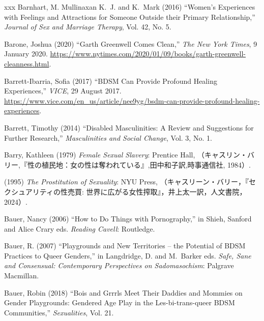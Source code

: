 \documentclass[]{jlreq} \usepackage{mystyle}
\begin{document}
\begin{thebibliography}{xxx}
Barnhart, M. Mullinaxan K.~J. and K.~Mark (2016) ``Women's Experiences with
  Feelings and Attractions for Someone Outside their Primary Relationship,''
  \textit{ Journal of Sex and Marriage Therapy}, Vol. 42, No. 5.

Barone, Joshua (2020) ``Garth Greenwell Comes Clean,'' \emph{The New York
  Times}, 9 January 2020.
  \url{https://www.nytimes.com/2020/01/09/books/garth-greenwell-cleanness.html}.

Barrett-Ibarria, Sofia (2017) ``BDSM Can Provide Profound Healing
  Experiences,'' \emph{VICE}, 29 August 2017.
  \url{https://www.vice.com/en_us/article/nee9yg/bsdm-can-provide-profound-healing-experiences}.

Barrett, Timothy (2014) ``Disabled Masculinities: A Review and Suggestions for
  Further Research,'' \textit{ Masculinities and Social Change}, Vol. 3, No. 1.

Barry, Kathleen (1979)  \textit{ Female Sexual Slavery}: Prentice Hall,
  （キャスリン・バリー,『性の植民地：女の性は奪われている』,田中和子訳,時事通信社,
  1984）.

 \bysame{}  (1995)  \textit{ The Prostitution of Sexuality}: NYU Press,
  （キャスリーン・バリー，『セクシュアリティの性売買:
  世界に広がる女性搾取』，井上太一訳，人文書院，2024）.

Bauer, Nancy (2006) ``How to Do Things with Pornography,'' in Shieh, Sanford
  and Alice Crary eds.   \textit{ Reading Cavell}: Routledge.

Bauer, R. (2007) ``Playgrounds and New Territories -- the Potential of BDSM
  Practices to Queer Genders,'' in Langdridge, D. and M.~Barker eds.   \textit{
  Safe, Sane and Consensual: Contemporary Perspectives on Sadomasochism}:
  Palgrave Macmillan.

Bauer, Robin (2018) ``Bois and Grrrls Meet Their Daddies and Mommies on Gender
  Playgrounds: Gendered Age Play in the Les-bi-trans-queer BDSM Communities,''
  \textit{ Sexualities}, Vol. 21.


\end{thebibliography}
\end{document}
